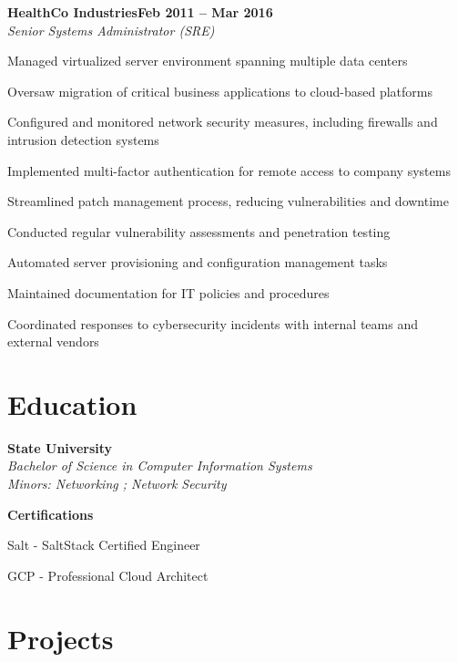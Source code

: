 \documentclass[letterpaper,10pt]{article}
\newcommand{\heading}[2]{
  \hspace{10pt}#1\hfill#2\\
}
\newcommand{\headingBf}[2]{
  \heading{\textbf{#1}}{\textbf{#2}}
}
\newcommand{\headingIt}[2]{
  \heading{\textit{#1}}{\textit{#2}}
}
\newenvironment{resume_list}{
  \vspace{-7pt}
  \begin{itemize}[itemsep=-2px, parsep=1pt, leftmargin=30pt]
}{
  \end{itemize}
}
\begin{document}
  \headingBf{HealthCo Industries}{Feb 2011 -- Mar 2016}
  \headingIt{Senior Systems Administrator (SRE)}{}
  \begin{resume_list}
    \item Managed virtualized server environment spanning multiple data centers
    \item Oversaw migration of critical business applications to cloud-based platforms
    \item Configured and monitored network security measures, including firewalls and intrusion detection systems
    \item Implemented multi-factor authentication for remote access to company systems
    \item Streamlined patch management process, reducing vulnerabilities and downtime
    \item Conducted regular vulnerability assessments and penetration testing
    \item Automated server provisioning and configuration management tasks
    \item Maintained documentation for IT policies and procedures
    \item Coordinated responses to cybersecurity incidents with internal teams and external vendors
  \end{resume_list}


  \section{Education}

  \headingBf{State University}{} %
  \headingIt{Bachelor of Science in Computer Information Systems}{}
  \headingIt{Minors: Networking ; Network Security}{}

  \vspace{5pt}
  \headingBf{Certifications}{}
  \begin{resume_list}
    \item Salt \hspace{2pt}- SaltStack Certified Engineer
    \item GCP - Professional Cloud Architect
  \end{resume_list}


  \section{Projects}
\end{document}
